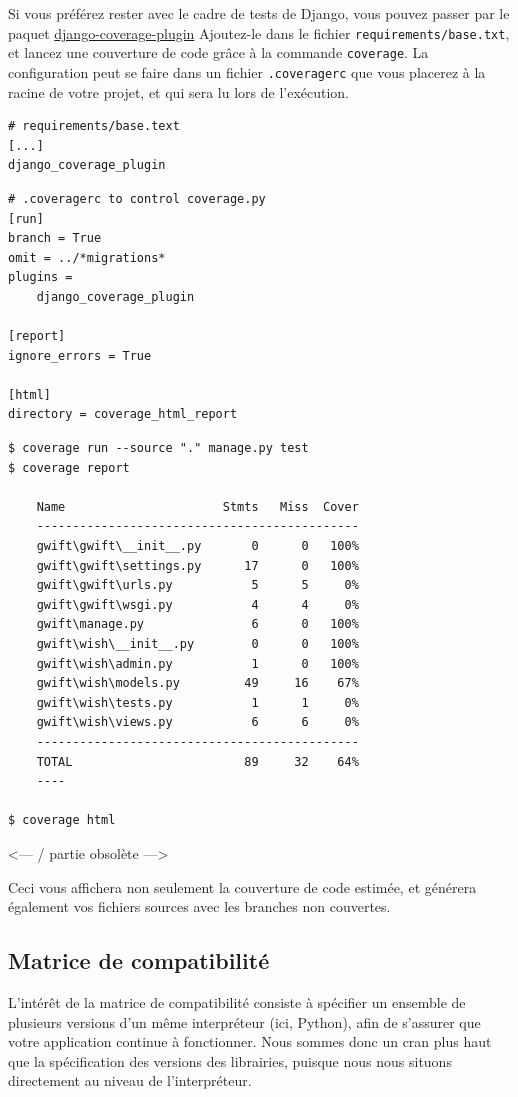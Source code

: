 \documentclass[11pt]{amsbook}
\begin{document}
Si vous préférez rester avec le cadre de tests de Django, vous pouvez passer par le paquet \href{https://pypi.org/project/django-coverage-plugin/}{django-coverage-plugin} Ajoutez-le dans le fichier \texttt{requirements/base.txt}, et lancez une couverture de code grâce à la commande \texttt{coverage}.
La configuration peut se faire dans un fichier \texttt{.coveragerc} que vous placerez à la racine de votre projet, et qui sera lu lors de l’exécution.


\begin{verbatim}
# requirements/base.text
[...]
django_coverage_plugin
\end{verbatim}

\begin{verbatim}
# .coveragerc to control coverage.py
[run]
branch = True
omit = ../*migrations*
plugins =
    django_coverage_plugin

[report]
ignore_errors = True

[html]
directory = coverage_html_report
\end{verbatim}

\begin{verbatim}
$ coverage run --source "." manage.py test
$ coverage report

    Name                      Stmts   Miss  Cover
    ---------------------------------------------
    gwift\gwift\__init__.py       0      0   100%
    gwift\gwift\settings.py      17      0   100%
    gwift\gwift\urls.py           5      5     0%
    gwift\gwift\wsgi.py           4      4     0%
    gwift\manage.py               6      0   100%
    gwift\wish\__init__.py        0      0   100%
    gwift\wish\admin.py           1      0   100%
    gwift\wish\models.py         49     16    67%
    gwift\wish\tests.py           1      1     0%
    gwift\wish\views.py           6      6     0%
    ---------------------------------------------
    TOTAL                        89     32    64%
    ----

$ coverage html
\end{verbatim}

<--- / partie obsolète --->


Ceci vous affichera non seulement la couverture de code estimée, et générera également vos fichiers sources avec les branches non couvertes.


\hypertarget{x-matrice-de-compatibilité}{\subsection{Matrice de compatibilité}}
L’intérêt de la matrice de compatibilité consiste à spécifier un ensemble de plusieurs versions d’un même interpréteur (ici, Python), afin de s’assurer que votre application continue à fonctionner. Nous sommes donc un cran plus haut que la spécification des versions des librairies, puisque nous nous situons directement au niveau de l’interpréteur.
\end{document}
